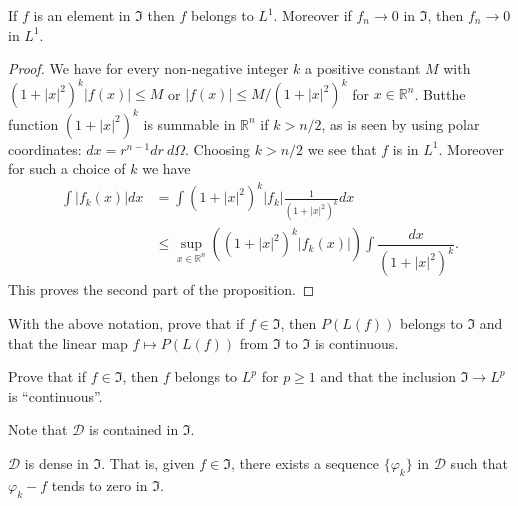 \begin{proposition}\label{chap4-prop2}
If $f$ is an element in $\mathfrak{I}$ then $f$ belongs to
$L^{1}$. Moreover if $f_{n}\to 0$ in $\mathfrak{I}$, then $f_{n}\to 0$
in $L^{1}$.
\end{proposition}

\begin{proof}
We have for every non-negative integer $k$ a positive constant $M$
with $(1+|x|^{2})^{k}|f(x)|\leq M$ or $|f(x)|\leq M/(1+|x|^{2})^{k}$
for $x\in \mathbb{R}^{n}$. But\pageoriginale the function
$(1+|x|^{2})^{k}$ is summable in $\mathbb{R}^{n}$ if $k>n/2$, as is
seen by using polar coordinates: $dx=r^{n-1}dr \ d\Omega$. Choosing
$k>n/2$ we see that $f$ is in $L^{1}$. Moreover for such a choice of
$k$ we have
\begin{align*}
\int |f_{k}(x)|dx &= \int
(1+|x|^{2})^{k}|f_{k}|\frac{1}{(1+|x|^{2})^{k}}dx\\[3pt]
&\leq \sup\limits_{x\in \mathbb{R}^{n}}\left((1+|x|^{2})^{k}|f_{k}(x)|\right)\int\dfrac{dx}{(1+|x|^{2})^{k}}.
\end{align*}
This proves the second part of the proposition.
\end{proof}

\begin{exer*}
With the above notation, prove that if $f\in \mathfrak{I}$, then
$P(L(f))$ belongs to $\mathfrak{I}$ and that the linear map $f\mapsto
P(L(f))$ from $\mathfrak{I}$ to $\mathfrak{I}$ is continuous.
\end{exer*}

\begin{exer*}
Prove that if $f\in \mathfrak{I}$, then $f$ belongs to $L^{p}$ for
$p\geq 1$ and that the inclusion $\mathfrak{I}\to L^{p}$ is ``continuous''.
\end{exer*}

Note that $\mathcal{D}$ is contained in $\mathfrak{I}$.

\begin{proposition}\label{chap4-prop3}
$\mathcal{D}$ is dense in $\mathfrak{I}$. That is, given $f\in
  \mathfrak{I}$, there exists a sequence $\{\varphi_{k}\}$ in
  $\mathcal{D}$ such that $\varphi_{k}-f$ tends to zero in $\mathfrak{I}$.
\end{proposition}

